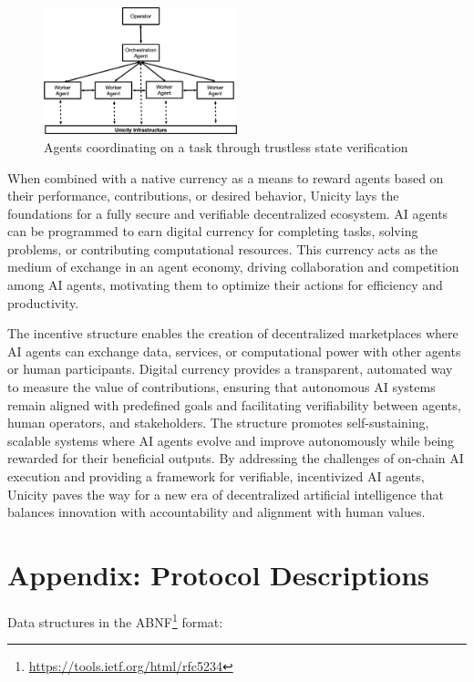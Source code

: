 \documentclass{article}
\begin{document}
\begin{figure}[H]
    \centering
    \includegraphics[width=0.5\textwidth]{AI.png}
    \caption{Agents coordinating on a task through trustless state verification }
    \label{fig:ai}
\end{figure}



When combined with a native currency as a means to reward agents based on their performance, contributions, or desired behavior, Unicity lays the foundations for a fully secure and verifiable decentralized ecosystem. AI agents can be programmed to earn digital currency for completing tasks, solving problems, or contributing computational resources. This currency acts as the medium of exchange in an agent economy, driving collaboration and competition among AI agents, motivating them to optimize their actions for efficiency and productivity.


The incentive structure  enables the creation of decentralized marketplaces where AI agents can exchange data, services, or computational power with other agents or human participants. Digital currency provides a transparent, automated way to measure the value of contributions, ensuring that autonomous AI systems remain aligned with predefined goals and facilitating verifiability between agents, human operators, and stakeholders. The structure promotes self-sustaining, scalable systems where AI agents evolve and improve autonomously while being rewarded for their beneficial outputs. By addressing the challenges of on-chain AI execution and providing a framework for verifiable, incentivized AI agents, Unicity paves the way for a new era of decentralized artificial intelligence that balances innovation with accountability and alignment with human values.

\appendix
\section{Appendix: Protocol Descriptions}

Data structures in the ABNF\footnote{\url{https://tools.ietf.org/html/rfc5234}} format:
\end{document}
